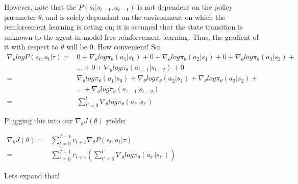 \documentclass[letterpaper,11pt]{article}
\begin{document}
However, note that the $P(s_{t} | s_{t-1}, a_{t-1})$ is not dependent on the policy parameter $\theta$, and is solely dependant on the environment on which the reinforcement learning is acting on; it is assumed that the state transition is unknown to the agent in model free reinforcement learning. Thus, the gradient of it with respect to $\theta$ will be 0. How convenient! So: 
$$
\begin{aligned}
    \nabla_{\theta} log P(s_{t}, a_{t} | \tau) ={}& 0 + \nabla_{\theta} log \pi_{\theta}(a_{1} | s_{0}) + 0 + \nabla_{\theta} log \pi_{\theta}(a_{2} | s_{1}) + 0 + \nabla_{\theta} log \pi_{\theta}(a_{3} | s_{2}) + \\ & {} ... {} + {} 0 + \nabla_{\theta} log \pi_{\theta}(a_{t-1} | s_{t-2}) + 0 \\ ={}& \nabla_{\theta} log \pi_{\theta}(a_{1} | s_{0}) + \nabla_{\theta} log \pi_{\theta}(a_{2} | s_{1}) + \nabla_{\theta} log \pi_{\theta}(a_{3} | s_{2}) + \\
& ... + \nabla_{\theta} log \pi_{\theta}(a_{t-1} | s_{t-2}) \\ ={}& \sum\limits_{t'=0}^{t} \nabla_{\theta} log \pi_{\theta}(a_{t'} | s_{t'})                                                
\end{aligned}
$$

Plugging this into our $\nabla_{\theta} J(\theta)$ yields:

$\begin{aligned}
    \nabla_{\theta} J(\theta) ={}& \sum_{t=0}^{T-1} r_{t+1} \nabla_{\theta} P(s_{t}, a_{t} | \tau) \\
                              ={}& \sum_{t=0}^{T-1} r_{t+1} (\sum_{t'=0}^{t} \nabla_{\theta} log \pi_{\theta}(a_{t'} | s_{t'}))
\end{aligned}$

\vspace{1.0cm}
Lets expand that! 
\end{document}
